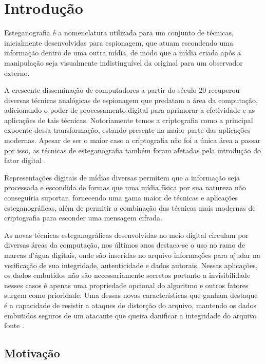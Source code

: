 \chapter{Introdução}

Esteganografia é a nomenclatura utilizada para um conjunto de técnicas, inicialmente desenvolvidas para espionagem, que atuam escondendo uma informação dentro de uma outra mídia, de modo que a mídia criada após a manipulação seja visualmente indistinguível da original para um observador externo.

A crescente disseminação de computadores a partir do século 20 recuperou diversas técnicas analógicas de espionagem que predatam a área da computação, adicionando o poder de processamento digital para aprimorar a efetividade e as aplicações de tais técnicas. Notoriamente temos a criptografia como a principal expoente dessa transformação, estando presente na maior parte das aplicações modernas. Apesar de ser o maior caso a criptografia não foi a única área a passar por isso, as técnicas de esteganografia também foram afetadas pela introdução do fator digital \cite{JohnsonJajodia}.

Representações digitais de mídias diversas permitem que a informação seja processada e escondida de formas que uma mídia física por sua natureza não conseguiria suportar, fornecendo uma gama maior de técnicas e aplicações esteganográficas, além de permitir a combinação das técnicas mais modernas de criptografia para esconder uma mensagem cifrada.

As novas técnicas esteganográficas desenvolvidas no meio digital circulam por diversas áreas da computação, nos últimos anos destaca-se o uso no ramo de marcas d'água digitais, onde são inseridas no arquivo informações para ajudar na verificação de sua integridade, autenticidade e dados autorais. Nessas aplicações, os dados embutidos não são necessariamente secretos portanto a invisibilidade nesses casos é apenas uma propriedade opcional do algoritmo e outros fatores surgem como prioridade. Uma dessas novas características que ganham destaque é a capacidade de resistir a ataques de distorção do arquivo, mantendo os dados embutidos seguros de um atacante que queira danificar a integridade do arquivo fonte \cite{9187785}.

\section{Motivação}

